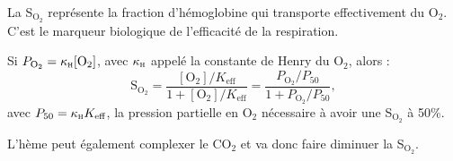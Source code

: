 \begin{solution}
\begin{questions}
    \question La S$_{\text{O}_2}$ représente la fraction d'hémoglobine qui transporte effectivement du O$_2$. C'est le marqueur biologique de l'efficacité de la respiration.
    
    \question Si $P_{\text{O}_2} = \kappa_\textsc{h} \mathrm{[O_2]}$, avec $\kappa_\textsc{h}$ appelé la constante de Henry du O$_2$, alors :
    $$\mathrm{S_{O_2}} = \dfrac{\mathrm{[O_2]}/K_\text{eff}}{1 + \mathrm{[O_2]}/K_\text{eff}} = \dfrac{P_{\text{O}_2}/P_{50}}{1 + P_{\text{O}_2}/P_{50}},$$
    avec $P_{50} = \kappa_\textsc{h}K_\text{eff}$, la pression partielle en O$_2$ nécessaire à avoir une S$_{\text{O}_2}$ à 50\%.
    
    \question L'hème peut également complexer le CO$_2$ et va donc faire diminuer la S$_{\text{O}_2}$.
    
\end{questions}
\end{solution}